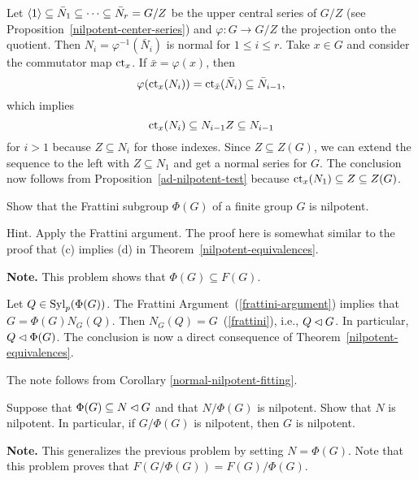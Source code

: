 \begin{solution} Let $\langle1\rangle\subseteq \bar N_1\subseteq\cdots\subseteq \bar N_r=G/Z$ be the upper central series of $G/Z$ (see Proposition~\ref{nilpotent-center-series}) and $\varphi\colon G\to G/Z$ the projection onto the quotient. Then $N_i=\varphi^{-1}(\bar N_i)$ is normal for $1\le i\le r$. Take $x\in G$ and consider the commutator map $\operatorname{\operatorname{ct}}_x$. If $\bar x=\varphi(x)$, then
$$
    \varphi(\operatorname{\operatorname{ct}}_x(N_i))=\operatorname{\operatorname{ct}}_{\bar x}(\bar N_i)\subseteq\bar N_{i-1},
$$
which implies
$$
    \operatorname{\operatorname{ct}}_x(N_i)\subseteq N_{i-1}Z\subseteq N_{i-1}
$$
for $i>1$ because $Z\subseteq N_i$ for those indexes. Since $Z\subseteq Z(G)$, we can extend the sequence to the left with $Z\subseteq N_1$ and get a normal series for $G$. The conclusion now follows from Proposition~\ref{ad-nilpotent-test} because $\operatorname{\operatorname{ct}}_x(N_1)\subseteq Z\subseteq Z(G)$.  \end{solution}

\begin{probl}
    Show that the Frattini subgroup\/ $\Phi(G)$ of a finite group\/ $G$ is nilpotent.

    \textrm{\rm Hint. Apply the Frattini argument. The proof here is somewhat similar to the proof that (c) implies (d) in Theorem~\ref{nilpotent-equivalences}}.
    
    \textrm{\rm {\bf Note.} This problem shows that $\Phi(G) \subseteq F(G)$.}
\end{probl}

\begin{solution} Let $Q\in{\rm Syl}_p(\Phi(G))$. The Frattini Argument~(\ref{frattini-argument}) implies that $G=\Phi(G)N_G(Q)$. Then $N_G(Q)=G$~(\ref{frattini}), i.e., $Q\lhd G$. In particular, $Q\lhd\Phi(G)$. The conclusion is now a direct consequence of Theorem~\ref{nilpotent-equivalences}.

The note follows from Corollary \ref{normal-nilpotent-fitting}.  \end{solution}

\begin{probl}\label{problem-1.D.15}
    Suppose that\/ $\Phi(G)\subseteq N\lhd G$ and that\/ $N/\Phi(G)$ is nilpotent. Show that\/ $N$ is nilpotent. In particular, if\/ $G/\Phi(G)$ is nilpotent, then\/ $G$ is nilpotent.

    \textrm{\rm{\bf Note.} This generalizes the previous problem by setting $N = \Phi(G)$. Note that this problem proves that $F(G/\Phi(G)) = F(G)/\Phi(G)$.}
\end{probl}


